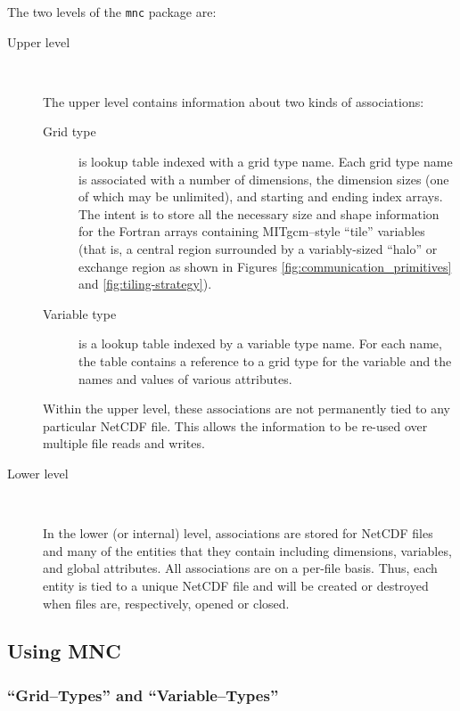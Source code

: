 The two levels of the \texttt{mnc} package are:
\begin{description}

\item[Upper level] \ 
  
  The upper level contains information about two kinds of
  associations:
  \begin{description}
  \item[Grid type] is lookup table indexed with a grid type name.
    Each grid type name is associated with a number of dimensions, the
    dimension sizes (one of which may be unlimited), and starting and
    ending index arrays.  The intent is to store all the necessary
    size and shape information for the Fortran arrays containing
    MITgcm--style ``tile'' variables (that is, a central region
    surrounded by a variably-sized ``halo'' or exchange region as
    shown in Figures \ref{fig:communication_primitives} and
    \ref{fig:tiling-strategy}).
  
  \item[Variable type] is a lookup table indexed by a variable type
    name.  For each name, the table contains a reference to a grid
    type for the variable and the names and values of various
    attributes.
  \end{description}
  
  Within the upper level, these associations are not permanently tied
  to any particular NetCDF file.  This allows the information to be
  re-used over multiple file reads and writes.

\item[Lower level] \ 
  
  In the lower (or internal) level, associations are stored for NetCDF
  files and many of the entities that they contain including
  dimensions, variables, and global attributes.  All associations are
  on a per-file basis.  Thus, each entity is tied to a unique NetCDF
  file and will be created or destroyed when files are, respectively,
  opened or closed.

\end{description}


\subsection{Using MNC}

\subsubsection{``Grid--Types'' and ``Variable--Types''}

